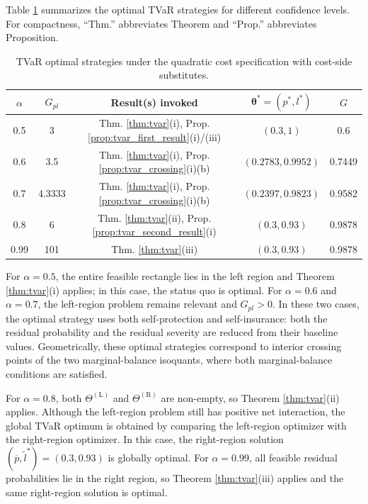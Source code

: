 \documentclass[a4paper,12pt]{article}
\begin{document}
Table \ref{tab:tvar_positive_illustration} summarizes the optimal TVaR strategies for different confidence levels. For compactness, ``Thm.'' abbreviates Theorem and ``Prop.'' abbreviates Proposition.
\begin{table}[htbp]
\centering
\begin{tabular}{c c c c c}
\hline
\(\alpha\) & \(G_{pl}\) & Result(s) invoked & \({\bm\theta}^*=\left(p^*,l^*\right)\) & $G$ \\
\hline
0.5 & 3 & Thm. \ref{thm:tvar}(i), Prop. \ref{prop:tvar_first_result}(i)/(iii) & \(\left(0.3,1\right)\) & 0.6 \\
0.6 & 3.5 & Thm. \ref{thm:tvar}(i), Prop. \ref{prop:tvar_crossing}(i)(b) & \(\left(0.2783,0.9952\right)\) & 0.7449 \\
0.7 & 4.3333 & Thm. \ref{thm:tvar}(i), Prop. \ref{prop:tvar_crossing}(i)(b) & \(\left(0.2397,0.9823\right)\) & 0.9582 \\
0.8 & 6 & Thm. \ref{thm:tvar}(ii), Prop. \ref{prop:tvar_second_result}(i) & \(\left(0.3,0.93\right)\) & 0.9878 \\
0.99 & 101 & Thm. \ref{thm:tvar}(iii) & \(\left(0.3,0.93\right)\) & 0.9878 \\
\hline
\end{tabular}
\caption{TVaR optimal strategies under the quadratic cost specification with cost-side substitutes.}
\label{tab:tvar_positive_illustration}
\end{table}

\noindent
For $\alpha=0.5$, the entire feasible rectangle lies in the left region and Theorem \ref{thm:tvar}(i) applies; in this case, the status quo is optimal. For $\alpha=0.6$ and $\alpha=0.7$, the left-region problem remains relevant and $G_{pl}>0$. In these two cases, the optimal strategy uses both self-protection and self-insurance: both the residual probability and the residual severity are reduced from their baseline values. Geometrically, these optimal strategies correspond to interior crossing points of the two marginal-balance isoquants, where both marginal-balance conditions are satisfied.

For $\alpha=0.8$, both $\Theta^{\left(\text{L}\right)}$ and $\Theta^{\left(\text{R}\right)}$ are non-empty, so Theorem \ref{thm:tvar}(ii) applies. Although the left-region problem still has positive net interaction, the global TVaR optimum is obtained by comparing the left-region optimizer with the right-region optimizer. In this case, the right-region solution \(\left(\overline{p},\tilde {l}^*\right)=\left(0.3,0.93\right)\) is globally optimal. For \(\alpha=0.99\), all feasible residual probabilities lie in the right region, so Theorem \ref{thm:tvar}(iii) applies and the same right-region solution is optimal.
\end{document}
